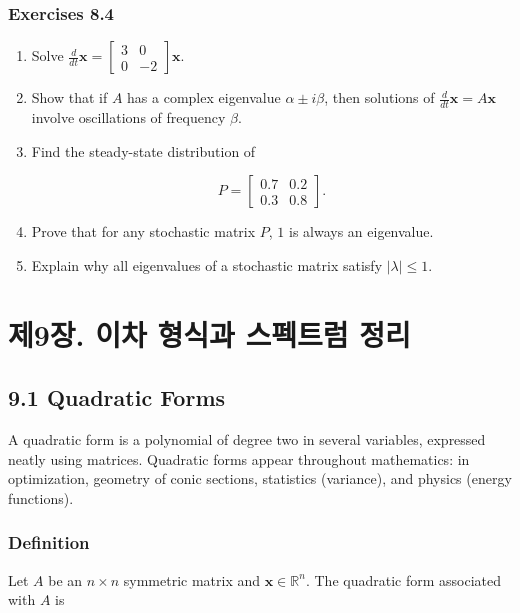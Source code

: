 \documentclass[
  12pt,
  a4paper,
]{article}
\let\oldsection\section
\renewcommand{\section}{\clearpage\oldsection}
\begin{document}
\subsubsection{Exercises 8.4}\label{exercises-84}

\begin{enumerate}
\def\labelenumi{\arabic{enumi}.}
\item
  Solve
  \(\tfrac{d}{dt}\mathbf{x} = \begin{bmatrix} 3 & 0 \\ 0 & -2 \end{bmatrix}\mathbf{x}\).
\item
  Show that if \(A\) has a complex eigenvalue \(\alpha \pm i\beta\),
  then solutions of \(\tfrac{d}{dt}\mathbf{x} = A\mathbf{x}\) involve
  oscillations of frequency \(\beta\).
\item
  Find the steady-state distribution of

  \[P = \begin{bmatrix} 0.7 & 0.2 \\ 0.3 & 0.8 \end{bmatrix}.\]
\item
  Prove that for any stochastic matrix \(P\), \(1\) is always an
  eigenvalue.
\item
  Explain why all eigenvalues of a stochastic matrix satisfy
  \(|\lambda| \leq 1\).
\end{enumerate}

\section{제9장. 이차 형식과 스펙트럼
정리}\label{chapter-9-quadratic-forms-and-spectral-theorems}

\subsection{9.1 Quadratic Forms}\label{91-quadratic-forms}

A quadratic form is a polynomial of degree two in several variables,
expressed neatly using matrices. Quadratic forms appear throughout
mathematics: in optimization, geometry of conic sections, statistics
(variance), and physics (energy functions).

\subsubsection{Definition}\label{definition-8}

Let \(A\) be an \(n \times n\) symmetric matrix and
\(\mathbf{x} \in \mathbb{R}^n\). The quadratic form associated with
\(A\) is
\end{document}
